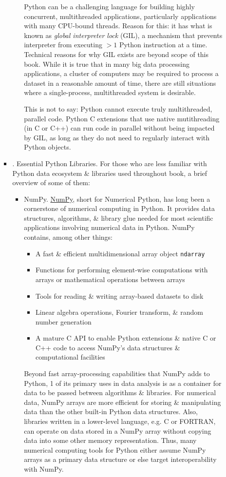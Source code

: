 \documentclass{article}
\begin{document}
\begin{enumerate}
\begin{itemize}
\begin{itemize}
\begin{itemize}
				Python can be a challenging language for building highly concurrent, multithreaded applications, particularly applications with many CPU-bound threads. Reason for this: it has what is known as {\it global interpreter lock} (GIL), a mechanism that prevents interpreter from executing $> 1$ Python instruction at a time. Technical reasons for why GIL exists are beyond scope of this book. While it is true that in many big data processing applications, a cluster of computers may be required to process a dataset in a reasonable amount of time, there are still situations where a single-process, multithreaded system is desirable.
				
				This is not to say: Python cannot execute truly multithreaded, parallel code. Python C extensions that use native mutithreading (in C or C++) can run code in parallel without being impacted by GIL, as long as they do not need to regularly interact with Python objects.
			\end{itemize}
			\item {. Essential Python Libraries.} For those who are less familiar with Python data ecosystem \& libraries used throughout book, a brief overview of some of them:
			\begin{itemize}
				\item {\sf NumPy.} \href{https://numpy.org}{NumPy}, short for Numerical Python, has long been a cornerstone of numerical computing in Python. It provides data structures, algorithms, \& library glue needed for most scientific applications involving numerical data in Python. NumPy contains, among other things:
				\begin{itemize}
					\item A fast \& efficient multidimensional array object {\tt ndarray}
					\item Functions for performing element-wise computations with arrays or mathematical operations between arrays
					\item Tools for reading \& writing array-based datasets to disk
					\item Linear algebra operations, Fourier transform, \& random number generation
					\item A mature C API to enable Python extensions \& native C or C++ code to access NumPy's data structures \& computational facilities
				\end{itemize}
				Beyond fast array-processing capabilities that NumPy adds to Python, 1 of its primary uses in data analysis is as a container for data to be passed between algorithms \& libraries. For numerical data, NumPy arrays are more efficient for storing \& manipulating data than the other built-in Python data structures. Also, libraries written in a lower-level language, e.g. C or FORTRAN, can operate on data stored in a NumPy array without copying data into some other memory representation. Thus, many numerical computing tools for Python either assume NumPy arrays as a primary data structure or else target interoperability with NumPy.

\end{itemize}
\end{itemize}
\end{itemize}
\end{enumerate}
\end{document}
